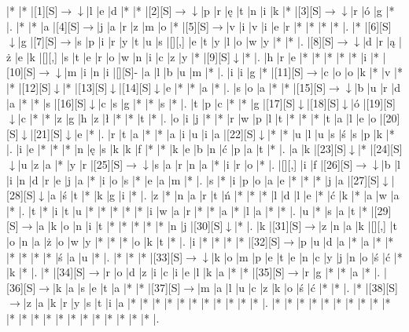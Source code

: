 \documentclass[11pt]{article}
\newcommand\drarr{$\rightarrow \!\!\!\!\! \downarrow$}
\newcommand\rarr{$\rightarrow$}
\newcommand\darr{$\downarrow$}
\begin{document}
\noindent\begin{Puzzle}{21}{23}|*	|*	|[1][S]\drarr	|l	|e	|d	|*	|*	|[2][S]\drarr	|p	|r	|ę	|t	|n	|i	|k	|*	|[3][S]\drarr	|r	|ó	|g	|*	|.
|*	|*	|a	|[4][S]\rarr	|j	|a	|r	|z	|m	|o	|*	|[5][S]\rarr	|v	|i	|v	|i	|e	|r	|*	|*	|*	|*	|.
|*	|[6][S]\darr	|g	|[7][S]\rarr	|s	|p	|i	|r	|y	|t	|u	|s	|[][,]{ }	|e	|t	|y	|l	|o	|w	|y	|*	|*	|.
|[8][S]\drarr	|d	|r	|ą	|ż	|e	|k	|[][,]{ }	|s	|t	|e	|r	|o	|w	|n	|i	|c	|z	|y	|*	|[9][S]\darr	|*	|.
|h	|r	|e	|*	|*	|*	|*	|*	|i	|*	|[10][S]\drarr	|m	|i	|n	|i	|[][S]-	|a	|l	|b	|u	|m	|*	|.
|i	|i	|g	|*	|[11][S]\rarr	|c	|o	|o	|k	|*	|v	|*	|*	|[12][S]\darr	|*	|[13][S]\darr	|[14][S]\darr	|e	|*	|*	|a	|*	|.
|s	|o	|a	|*	|*	|[15][S]\drarr	|b	|u	|r	|d	|a	|*	|*	|s	|[16][S]\darr	|c	|s	|g	|*	|*	|s	|*	|.
|t	|p	|c	|*	|*	|g	|[17][S]\darr	|[18][S]\darr	|ó	|[19][S]\darr	|c	|*	|*	|z	|g	|h	|z	|ł	|*	|*	|t	|*	|.
|o	|i	|j	|*	|*	|r	|w	|p	|l	|t	|*	|*	|*	|t	|a	|l	|e	|o	|[20][S]\darr	|[21][S]\darr	|e	|*	|.
|r	|t	|a	|*	|*	|a	|i	|u	|i	|a	|[22][S]\darr	|*	|*	|u	|l	|u	|s	|ś	|s	|p	|k	|*	|.
|i	|e	|*	|*	|*	|n	|ę	|s	|k	|k	|f	|*	|*	|k	|e	|b	|n	|ć	|p	|a	|t	|*	|.
|a	|k	|[23][S]\darr	|*	|[24][S]\darr	|u	|z	|a	|*	|y	|r	|[25][S]\drarr	|s	|a	|r	|n	|a	|*	|i	|r	|o	|*	|.
|[][,]{ }	|i	|f	|[26][S]\drarr	|b	|l	|i	|n	|d	|r	|e	|j	|a	|*	|i	|o	|s	|*	|e	|a	|m	|*	|.
|s	|*	|i	|p	|o	|a	|e	|*	|*	|*	|j	|a	|[27][S]\darr	|[28][S]\darr	|a	|ś	|t	|*	|k	|g	|i	|*	|.
|z	|*	|n	|a	|r	|t	|ń	|*	|*	|*	|l	|d	|l	|e	|*	|ć	|k	|*	|a	|w	|a	|*	|.
|t	|*	|i	|t	|u	|*	|*	|*	|*	|*	|i	|w	|a	|r	|*	|*	|a	|*	|l	|a	|*	|*	|.
|u	|*	|s	|a	|t	|*	|[29][S]\rarr	|a	|k	|o	|n	|i	|t	|*	|*	|*	|*	|*	|n	|j	|[30][S]\darr	|*	|.
|k	|[31][S]\rarr	|z	|n	|a	|k	|[][,]{ }	|t	|o	|n	|a	|ż	|o	|w	|y	|*	|*	|*	|o	|k	|t	|*	|.
|i	|*	|*	|*	|*	|[32][S]\rarr	|p	|u	|d	|a	|*	|a	|*	|*	|*	|*	|*	|*	|ś	|a	|u	|*	|.
|*	|*	|*	|[33][S]\drarr	|k	|o	|m	|p	|e	|t	|e	|n	|c	|y	|j	|n	|o	|ś	|ć	|*	|k	|*	|.
|*	|[34][S]\rarr	|r	|o	|d	|z	|i	|c	|i	|e	|l	|k	|a	|*	|*	|[35][S]\rarr	|r	|g	|*	|*	|a	|*	|.
|[36][S]\rarr	|k	|a	|s	|e	|t	|a	|*	|*	|[37][S]\rarr	|m	|a	|l	|u	|c	|z	|k	|o	|ś	|ć	|*	|*	|.
|*	|[38][S]\rarr	|z	|a	|k	|r	|y	|s	|t	|i	|a	|*	|*	|*	|*	|*	|*	|*	|*	|*	|*	|*	|.
|*	|*	|*	|*	|*	|*	|*	|*	|*	|*	|*	|*	|*	|*	|*	|*	|*	|*	|*	|*	|*	|*	|.\end{Puzzle}

\newpage
\end{document}
